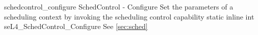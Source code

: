 %
%
%
%

\apidoc
{schedcontrol_configure}
{SchedControl - Configure}
{Set the parameters of a scheduling context by invoking the scheduling control capability}
{static inline int seL4\_SchedControl\_Configure }
{
}
{\errorenumdesc}
{See \autoref{sec:sched}}
